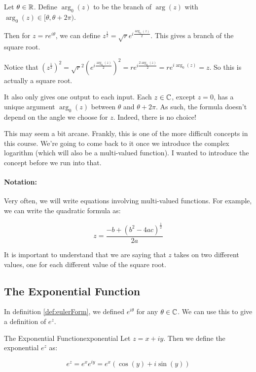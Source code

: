 \begin{ex}{}{} Let $\theta \in \mathbb{R}$. Define $\arg_0(z)$ to be the branch of $\arg(z)$ with $\arg_0(z)\in [\theta, \theta + 2\pi)$.

Then for $z = re^{i\theta}$, we can define $z^{\frac{1}{2}} = \sqrt{r}e^{i\frac{\arg_0(z)}{2}}$. This gives a branch of the square root.

Notice that $(z^{\frac{1}{2}})^2 = \sqrt{r}^2(e^{i\frac{\arg_0(z)}{2}})^2 = re^{i\frac{2\arg_0(z)}{2}} = re^{i\arg_0(z)} = z$. So this is actually a square root.

It also only gives one output to each input. Each $z\in \mathbb{C}$, except $z = 0$, has a unique argument $\arg_0(z)$ between $\theta$ and $\theta + 2\pi$. As such, the formula doesn't depend on the angle we choose for $z$. Indeed, there is no choice!
\end{ex}

This may seem a bit arcane. Frankly, this is one of the more difficult concepts in this course. We're going to come back to it once we introduce the complex logarithm (which will also be a multi-valued function). I wanted to introduce the concept before we run into that.

\paragraph{Notation:} Very often, we will write equations involving multi-valued functions. For example, we can write the quadratic formula as:

$$z = \frac{-b+ (b^2 - 4ac)^\frac{1}{2}}{2a}$$

It is important to understand that we are saying that $z$ takes on two different values, one for each different value of the square root.


\subsection{The Exponential Function}

In definition \ref{def:eulerForm}, we defined $e^{i\theta}$ for any $\theta \in \mathbb{C}$. We can use this to give a definition of $e^z$.

\begin{defbo}{The Exponential Function}{exponential} 
Let $z = x + iy$. Then we define the exponential $e^z$ as:

$$e^z = e^xe^{iy} = e^x(\cos(y) + i\sin(y))$$
\end{defbo}

